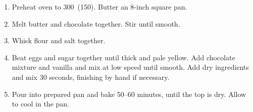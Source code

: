 
\begin{ingredients}
\end{ingredients}


\begin{recipe}
  \begin{enumerate}

  \item Preheat oven to 300\F\ (150\degreeC).  Butter an 8-inch square pan.

  \item Melt butter and chocolate together.  Stir until smooth.

  \item Whisk flour and salt together.

  \item Beat eggs and sugar together until thick and pale yellow.  Add
    chocolate mixture and vanilla and mix at low speed until smooth.
    Add dry ingredients and mix 30 seconds, finishing by hand if
    necessary.

  \item Pour into prepared pan and bake 50--60 minutes, until the top
    is dry.  Allow to cool in the pan.

  \end{enumerate}
\end{recipe}

